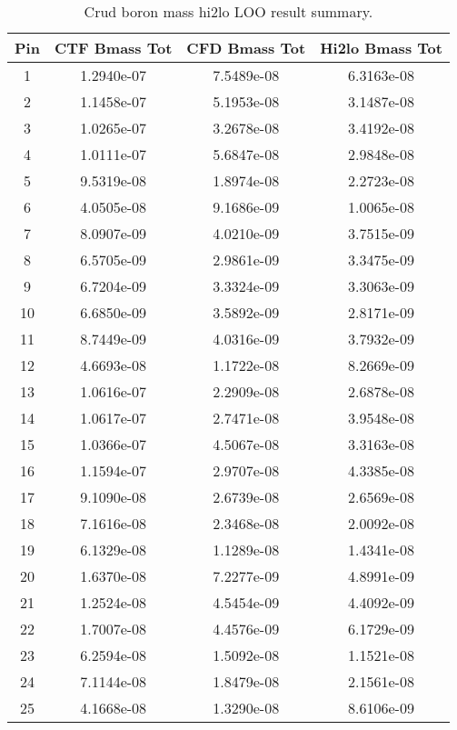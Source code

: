 \begin{table}[h]
    \begin{center}
    \caption[Hi2lo crud boron mass results]{Crud boron mass hi2lo LOO result summary.}
    \begin{tabular}[h]{|c|c|c|c|} 
        \hline
Pin & CTF Bmass Tot & CFD Bmass Tot & Hi2lo Bmass Tot  \\ 
\hline
1  & 1.2940e-07 & 7.5489e-08 & 6.3163e-08 \\ 
2  & 1.1458e-07 & 5.1953e-08 & 3.1487e-08 \\ 
3  & 1.0265e-07 & 3.2678e-08 & 3.4192e-08 \\ 
4  & 1.0111e-07 & 5.6847e-08 & 2.9848e-08 \\ 
5  & 9.5319e-08 & 1.8974e-08 & 2.2723e-08 \\ 
6  & 4.0505e-08 & 9.1686e-09 & 1.0065e-08 \\ 
7  & 8.0907e-09 & 4.0210e-09 & 3.7515e-09 \\ 
8  & 6.5705e-09 & 2.9861e-09 & 3.3475e-09 \\ 
9  & 6.7204e-09 & 3.3324e-09 & 3.3063e-09 \\ 
10  & 6.6850e-09 & 3.5892e-09 & 2.8171e-09 \\ 
11  & 8.7449e-09 & 4.0316e-09 & 3.7932e-09 \\ 
12  & 4.6693e-08 & 1.1722e-08 & 8.2669e-09 \\ 
13  & 1.0616e-07 & 2.2909e-08 & 2.6878e-08 \\ 
14  & 1.0617e-07 & 2.7471e-08 & 3.9548e-08 \\ 
15  & 1.0366e-07 & 4.5067e-08 & 3.3163e-08 \\ 
16  & 1.1594e-07 & 2.9707e-08 & 4.3385e-08 \\ 
17  & 9.1090e-08 & 2.6739e-08 & 2.6569e-08 \\ 
18  & 7.1616e-08 & 2.3468e-08 & 2.0092e-08 \\ 
19  & 6.1329e-08 & 1.1289e-08 & 1.4341e-08 \\ 
20  & 1.6370e-08 & 7.2277e-09 & 4.8991e-09 \\ 
21  & 1.2524e-08 & 4.5454e-09 & 4.4092e-09 \\ 
22  & 1.7007e-08 & 4.4576e-09 & 6.1729e-09 \\ 
23  & 6.2594e-08 & 1.5092e-08 & 1.1521e-08 \\ 
24  & 7.1144e-08 & 1.8479e-08 & 2.1561e-08 \\ 
25  & 4.1668e-08 & 1.3290e-08 & 8.6106e-09 \\ 
\hline
\end{tabular}
\label{tab:loo_crud_bmass}
\end{center}
\end{table}


